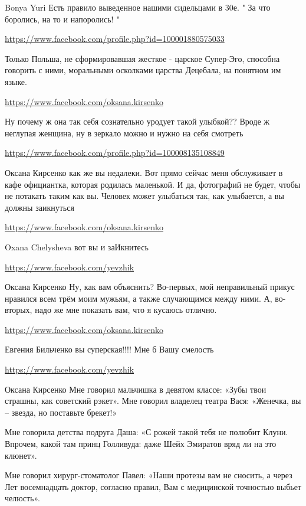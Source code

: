\documentclass[a4paper,11pt]{extreport}
\begin{document}
\begin{itemize}
\begin{itemize}
Bonya Yuri Есть правило выведенное нашими сидельцами в 30е. " За что боролись, на то и напоролись! "

\end{itemize}
\url{https://www.facebook.com/profile.php?id=100001880575033}

Только Польша, не сформировавшая жесткое - царское Супер-Эго, способна говорить с ними, моральными осколками царства Децебала, на понятном им языке.

\url{https://www.facebook.com/oksana.kirsenko}

Ну почему ж она так себя сознательно уродует такой улыбкой?? Вроде ж неглупая женщина, ну в зеркало можно и нужно на себя смотреть

\begin{itemize}
\url{https://www.facebook.com/profile.php?id=100008135108849}

Оксана Кирсенко как же вы недалеки. Вот прямо сейчас меня обслуживает в кафе официантка, которая родилась маленькой. И да, фотографий не будет, чтобы не потакать таким как вы. Человек может улыбаться так, как улыбается, а вы должны заикнуться

\url{https://www.facebook.com/oksana.kirsenko}

Oxana Chelysheva вот вы и заИкнитесь

\url{https://www.facebook.com/yevzhik}

Оксана Кирсенко Ну, как вам объяснить? Во-первых, мой неправильный прикус нравился всем трём моим мужьям, а также случающимся между ними. А, во-вторых, надо же мне показать вам, что я кусаюсь отлично.

\url{https://www.facebook.com/oksana.kirsenko}

Евгения Бильченко вы суперская!!!! Мне б Вашу смелость

\url{https://www.facebook.com/yevzhik}

Оксана Кирсенко Мне говорил мальчишка в девятом классе:
«Зубы твои страшны, как советский рэкет».
Мне говорил владелец театра Вася:
«Женечка, вы – звезда, но поставьте брекет!»

Мне говорила детства подруга Даша:
«С рожей такой тебя не полюбит Клуни.
Впрочем, какой там принц Голливуда: даже
Шейх Эмиратов вряд ли на это клюнет».

Мне говорил хирург-стоматолог Павел:
«Наши протезы вам не сносить, а через
Лет восемнадцать доктор, согласно правил,
Вам с медицинской точностью выбьет челюсть».


\end{itemize}
\end{itemize}
\end{document}
